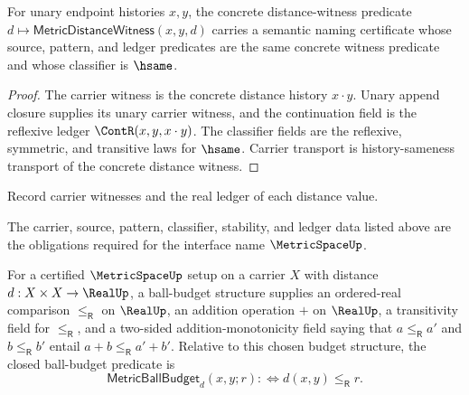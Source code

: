 \begin{theorem}
\label{thm:metric-distance-witness-semantic-namecert}
For unary endpoint histories $x,y$, the concrete distance-witness predicate
$d\mapsto\mathsf{MetricDistanceWitness}(x,y,d)$ carries a semantic naming
certificate whose source, pattern, and ledger predicates are the same concrete
witness predicate and whose classifier is $\hsame$.
\end{theorem}
\begin{proof}
The carrier witness is the concrete distance history $x\cdot y$. Unary append
closure supplies its unary carrier witness, and the continuation field is the
reflexive ledger $\ContR(x,y,x\cdot y)$. The classifier fields are the
reflexive, symmetric, and transitive laws for $\hsame$. Carrier transport is
history-sameness transport of the concrete distance witness.
\end{proof}

\begin{definition}
\label{def:metric-ledger-policy}
Record carrier witnesses and the real ledger of each distance value.
\end{definition}

\begin{definition}
\label{def:metric-certificate-obligations}
The carrier, source, pattern, classifier, stability, and ledger data listed above are the obligations required for the interface name \(\MetricSpaceUp\).
\end{definition}

\begin{definition}
\label{def:metric-ball-budget-predicate}
For a certified $\MetricSpaceUp$ setup on a carrier $X$ with distance
$d:X\times X\to\RealUp$, a ball-budget structure supplies an ordered-real
comparison $\le_{\mathsf R}$ on $\RealUp$, an addition operation $+$ on
$\RealUp$, a transitivity field for $\le_{\mathsf R}$, and a two-sided
addition-monotonicity field saying that $a\le_{\mathsf R} a'$ and
$b\le_{\mathsf R} b'$ entail $a+b\le_{\mathsf R} a'+b'$. Relative to this
chosen budget structure, the closed ball-budget predicate is
$$
\mathsf{MetricBallBudget}_d(x,y;r) :\Longleftrightarrow d(x,y)\le_{\mathsf R} r.
$$
\end{definition}

